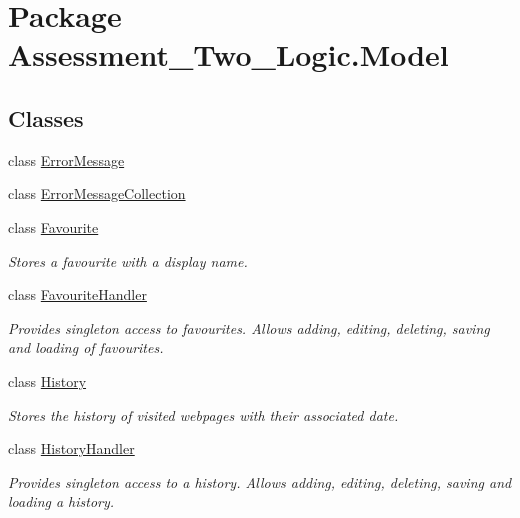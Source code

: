 \hypertarget{namespace_assessment___two___logic_1_1_model}{
\section{Package Assessment\_\-Two\_\-Logic.Model}
\label{namespace_assessment___two___logic_1_1_model}
}
\subsection*{Classes}
\begin{DoxyCompactItemize}
\item 
class \hyperlink{class_assessment___two___logic_1_1_model_1_1_error_message}{ErrorMessage}
\item 
class \hyperlink{class_assessment___two___logic_1_1_model_1_1_error_message_collection}{ErrorMessageCollection}
\item 
class \hyperlink{class_assessment___two___logic_1_1_model_1_1_favourite}{Favourite}
\begin{DoxyCompactList}\small\item\em Stores a favourite with a display name. \item\end{DoxyCompactList}\item 
class \hyperlink{class_assessment___two___logic_1_1_model_1_1_favourite_handler}{FavouriteHandler}
\begin{DoxyCompactList}\small\item\em Provides singleton access to favourites. Allows adding, editing, deleting, saving and loading of favourites. \item\end{DoxyCompactList}\item 
class \hyperlink{class_assessment___two___logic_1_1_model_1_1_history}{History}
\begin{DoxyCompactList}\small\item\em Stores the history of visited webpages with their associated date. \item\end{DoxyCompactList}\item 
class \hyperlink{class_assessment___two___logic_1_1_model_1_1_history_handler}{HistoryHandler}
\begin{DoxyCompactList}\small\item\em Provides singleton access to a history. Allows adding, editing, deleting, saving and loading a history. \item\end{DoxyCompactList}\item 

\end{DoxyCompactItemize}
